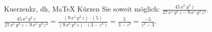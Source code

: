 \begin{MAufgabe}{Kuerzen}{kr, dh, MaTeX}
K\"urzen Sie soweit m\"oglich: $\frac{45\, x^5\, y^3\, z}{27\, x^5\, y^3\, z - 9\, x^5\, y^3\, z^4}$.\\ 
\ifLsg\MLoesung
\quad $\frac{45\, x^5\, y^3\, z}{27\, x^5\, y^3\, z - 9\, x^5\, y^3\, z^4}=\frac{(9\, x^5\, y^3\, z)\cdot(5)}{(9\, x^5\, y^3\, z)\cdot(3 - z^3)}=\frac{5}{3 - z^3}=\frac{-5}{z^3 - 3}$.\else\relax\fi
 \end{MAufgabe}